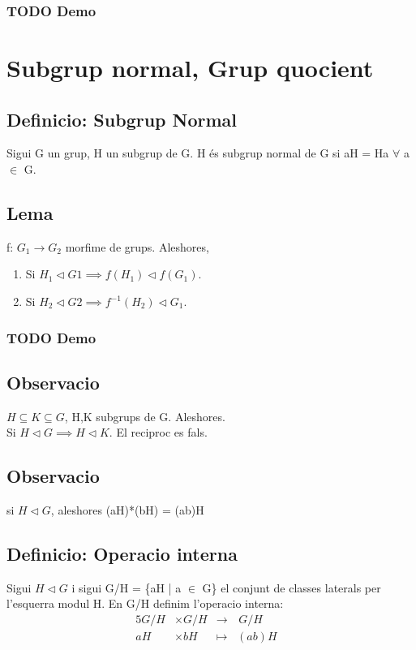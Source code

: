 \documentclass[11pt]{article}
\begin{document}
\subsubsection{{\bfseries\sffamily TODO} Demo}
\label{sec:orgaede8b8}

\section{Subgrup normal, Grup quocient}
\label{sec:orgf22384b}
\subsection{Definicio: Subgrup Normal}
\label{sec:orge0358a5}
Sigui G un grup, H un subgrup de G. H és subgrup normal de G si aH = Ha \(\forall\) a \(\in\) G.
\subsection{Lema}
\label{sec:org67c9a87}
f: \(G_1 \to G_2\) morfime de grups. Aleshores,
\begin{enumerate}
\item Si \(H_1 \vartriangleleft G1 \implies f(H_1) \vartriangleleft f(G_1)\).
\item Si \(H_2 \vartriangleleft G2 \implies f^{-1}(H_2) \vartriangleleft G_1\).
\end{enumerate}
\subsubsection{{\bfseries\sffamily TODO} Demo}
\label{sec:orgc24a234}
\subsection{Observacio}
\label{sec:org0c1a17b}
\(H \subseteq K \subseteq G\), H,K subgrups de G. Aleshores. \\
Si \(H \vartriangleleft G \implies H \vartriangleleft K\). El reciproc es fals.
\subsection{Observacio}
\label{sec:orgcd1aadc}
si \(H \vartriangleleft G\), aleshores (aH)*(bH) = (ab)H
\subsection{Definicio: Operacio interna}
\label{sec:org789dd96}
Sigui \(H \vartriangleleft G\) i sigui G/H = \{aH | a \(\in\) G\} el conjunt de classes laterals per l'esquerra modul H. En G/H definim l'operacio interna:
\begin{alignat*}{5}
G/H &\times G/H &\to&\hspace{2pt}  G/H & \\
aH &\times bH &\mapsto&  (ab)H &
\end{alignat*}
\end{document}
